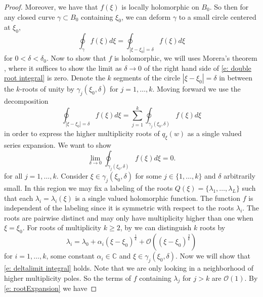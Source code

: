 \documentclass[a4paper,11pt]{article}
\theoremstyle{definition}
\begin{document}
\begin{proof}
    Moreover, we have that $f(\xi)$ is locally holomorphic on $B_0$. So then for any closed curve $\gamma\subset B_0$ containing $\xi_0$, we can deform $\gamma$ to a small circle centered at $\xi_0$,
    \begin{equation} \label{e: double root integral}
        \oint_{\gamma}f(\xi)d\xi = \oint_{|\xi-\xi_0|=\delta}f(\xi)d\xi
    \end{equation}
     for $0<\delta<\delta_0$. Now to show that $f$ is holomorphic, we will uses Morera's theorem \cite{Gamelin_2001}, where it suffices to show the limit as $\delta\to0$ of the right hand side of \eqref{e: double root integral} is zero. Denote the $k$ segments of the circle $|\xi-\xi_0|=\delta$ in between the $k$-roots of unity by $\gamma_j(\xi_0,\delta)$ for $j=1,\ldots,k$. Moving forward we use the decomposition 
     \begin{equation}
         \oint_{|\xi-\xi_0|=\delta}f(\xi)d\xi=\sum_{j=1}^k\oint_{\gamma_j(\xi_0,\delta)} f(\xi)d\xi 
     \end{equation}
    in order to express the higher multiplicity roots of $q_\xi(w)$ as a single valued series expansion. We want to show 
    \begin{equation} \label{e: deltalimit integral}
        \lim_{\delta\to0}\oint_{\gamma_j(\xi_0,\delta)} f(\xi)d\xi=0.
    \end{equation} for all $j=1,\ldots,k$.
    Consider $\xi\in\gamma_j(\xi_0,\delta)$ for some $j\in\{1,\ldots,k\}$ and $\delta$ arbitrarily small. In this region we may fix a labeling of the roots $Q(\xi)=\{\lambda_1,\ldots,\lambda_L\}$ such that each $\lambda_i=\lambda_i(\xi)$ is a single valued holomorphic function. The function $f$ is independent of the labeling since it is symmetric with respect to the roots $\lambda_i$. The roots are pairwise distinct and may only have multiplicity higher than one when $\xi=\xi_0$. For roots of multiplicity $k\geq2$, by  we can distinguish $k$ roots by \begin{equation} \label{e: rootExpansion}
        \lambda_i=\lambda_0+\alpha_i(\xi-\xi_0)^{\frac1k} +\mathcal{O}\left((\xi-\xi_0)^{\frac2k}\right)
    \end{equation}
    for $i=1,\ldots,k$, some constant $\alpha_i\in \mathbb{C}$ and $\xi\in\gamma_j(\xi_0,
    \delta)$. Now we will show that \cref{e: deltalimit integral} holds. Note that we are only looking in a neighborhood of higher multiplicity poles. So the terms of $f$ containing $\lambda_j$ for $j>k$ are $\mathcal{O}(1)$. By \cref{e: rootExpansion} we have 

\end{proof}
\end{document}
